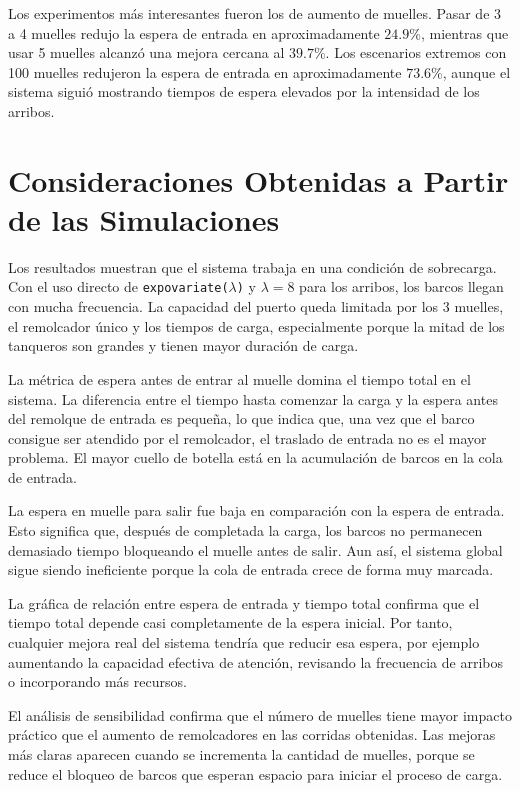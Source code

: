 \documentclass[12pt]{article}
\begin{document}
Los experimentos más interesantes fueron los de aumento de muelles. Pasar de 3 a 4 muelles redujo la espera de entrada en aproximadamente $24.9\%$, mientras que usar 5 muelles alcanzó una mejora cercana al $39.7\%$. Los escenarios extremos con 100 muelles redujeron la espera de entrada en aproximadamente $73.6\%$, aunque el sistema siguió mostrando tiempos de espera elevados por la intensidad de los arribos.

\section{Consideraciones Obtenidas a Partir de las Simulaciones}

Los resultados muestran que el sistema trabaja en una condición de sobrecarga. Con el uso directo de \texttt{expovariate($\lambda$)} y $\lambda=8$ para los arribos, los barcos llegan con mucha frecuencia. La capacidad del puerto queda limitada por los 3 muelles, el remolcador único y los tiempos de carga, especialmente porque la mitad de los tanqueros son grandes y tienen mayor duración de carga.

La métrica de espera antes de entrar al muelle domina el tiempo total en el sistema. La diferencia entre el tiempo hasta comenzar la carga y la espera antes del remolque de entrada es pequeña, lo que indica que, una vez que el barco consigue ser atendido por el remolcador, el traslado de entrada no es el mayor problema. El mayor cuello de botella está en la acumulación de barcos en la cola de entrada.

La espera en muelle para salir fue baja en comparación con la espera de entrada. Esto significa que, después de completada la carga, los barcos no permanecen demasiado tiempo bloqueando el muelle antes de salir. Aun así, el sistema global sigue siendo ineficiente porque la cola de entrada crece de forma muy marcada.

La gráfica de relación entre espera de entrada y tiempo total confirma que el tiempo total depende casi completamente de la espera inicial. Por tanto, cualquier mejora real del sistema tendría que reducir esa espera, por ejemplo aumentando la capacidad efectiva de atención, revisando la frecuencia de arribos o incorporando más recursos.

El análisis de sensibilidad confirma que el número de muelles tiene mayor impacto práctico que el aumento de remolcadores en las corridas obtenidas. Las mejoras más claras aparecen cuando se incrementa la cantidad de muelles, porque se reduce el bloqueo de barcos que esperan espacio para iniciar el proceso de carga.
\end{document}
